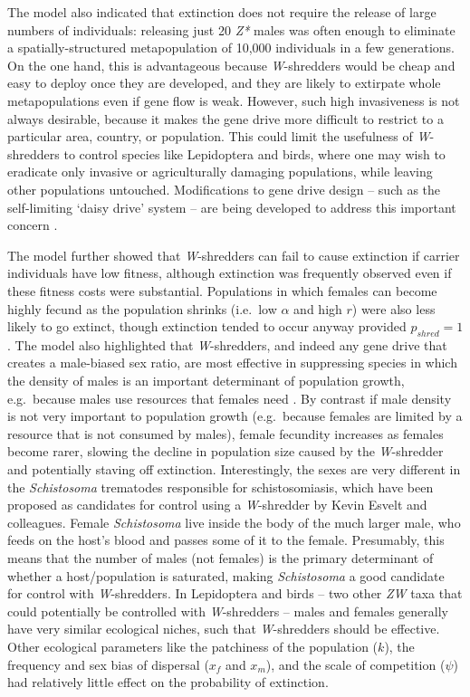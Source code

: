 \documentclass[]{rsos}%
\begin{document}
The model also indicated that extinction does not require the release of
large numbers of individuals: releasing just 20 \emph{Z*} males was
often enough to eliminate a spatially-structured metapopulation of
10,000 individuals in a few generations. On the one hand, this is
advantageous because \emph{W}-shredders would be cheap and easy to
deploy once they are developed, and they are likely to extirpate whole
metapopulations even if gene flow is weak. However, such high
invasiveness is not always desirable, because it makes the gene drive
more difficult to restrict to a particular area, country, or population.
This could limit the usefulness of \emph{W}-shredders to control species
like Lepidoptera and birds, where one may wish to eradicate only
invasive or agriculturally damaging populations, while leaving other
populations untouched. Modifications to gene drive design -- such as the
self-limiting `daisy drive' system -- are being developed to address
this important concern \citep{min2017da, noble2019da}.

The model further showed that \emph{W}-shredders can fail to cause
extinction if carrier individuals have low fitness, although extinction
was frequently observed even if these fitness costs were substantial.
Populations in which females can become highly fecund as the population
shrinks (i.e.~low \(\alpha\) and high \(r\)) were also less likely to go
extinct, though extinction tended to occur anyway provided
\(p_{shred} = 1\). The model also highlighted that \emph{W}-shredders,
and indeed any gene drive that creates a male-biased sex ratio, are most
effective in suppressing species in which the density of males is an
important determinant of population growth, e.g.~because males use
resources that females need \citep{li2019int}. By contrast if male
density is not very important to population growth (e.g.~because females
are limited by a resource that is not consumed by males), female
fecundity increases as females become rarer, slowing the decline in
population size caused by the \emph{W}-shredder and potentially staving
off extinction. Interestingly, the sexes are very different in the
\emph{Schistosoma} trematodes responsible for schistosomiasis, which
have been proposed as candidates for control using a \emph{W}-shredder
by Kevin Esvelt and colleagues. Female \emph{Schistosoma} live inside
the body of the much larger male, who feeds on the host's blood and
passes some of it to the female. Presumably, this means that the number
of males (not females) is the primary determinant of whether a
host/population is saturated, making \emph{Schistosoma} a good candidate
for control with \emph{W}-shredders. In Lepidoptera and birds -- two
other \emph{ZW} taxa that could potentially be controlled with
\emph{W}-shredders -- males and females generally have very similar
ecological niches, such that \emph{W}-shredders should be effective.
Other ecological parameters like the patchiness of the population
(\(k\)), the frequency and sex bias of dispersal (\(x_f\) and \(x_m\)),
and the scale of competition (\(\psi\)) had relatively little effect on
the probability of extinction.
\end{document}
